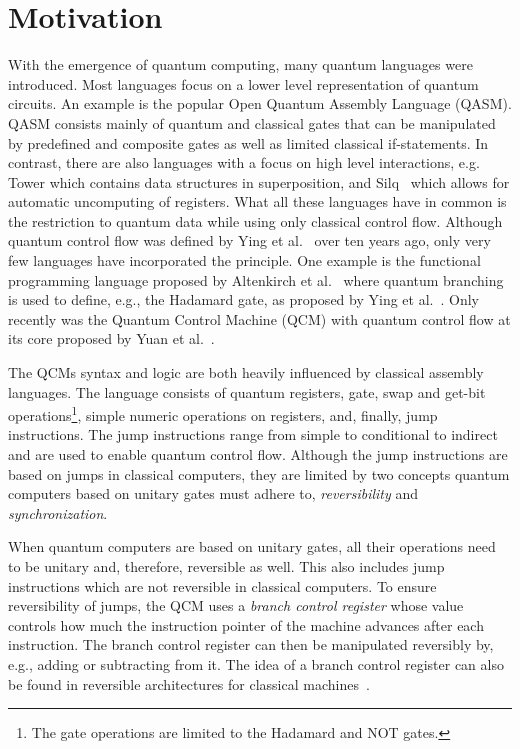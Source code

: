 \chapter{Motivation}
With the emergence of quantum computing, many quantum languages were introduced. Most languages focus on a lower level representation of quantum circuits. An example is the popular Open Quantum Assembly Language (QASM)\cite{CBSG17}. QASM consists mainly of quantum and classical gates that can be manipulated by predefined and composite gates as well as limited classical if-statements. In contrast, there are also languages with a focus on high level interactions, e.g. Tower\cite{ChMi22} which contains data structures in superposition, and Silq~\cite{BBGV20} which allows for automatic uncomputing of registers. What all these languages have in common is the restriction to quantum data while using only classical control flow. Although quantum control flow was defined by Ying et al.~\cite{YYF12} over ten years ago, only very few languages have incorporated the principle. One example is the functional programming language proposed by Altenkirch et al.~\cite{AlGr05} where quantum branching is used to define, e.g., the Hadamard gate, as proposed by Ying et al.~\cite{YYF12}. Only recently was the Quantum Control Machine (QCM) with quantum control flow at its core proposed by Yuan et al.~\cite{YVC24}. 

The QCMs syntax and logic are both heavily influenced by classical assembly languages. The language consists of quantum registers, gate, swap and get-bit operations\footnote{The gate operations are limited to the Hadamard and NOT gates.}, simple numeric operations on registers, and, finally, jump instructions. The jump instructions range from simple to conditional to indirect and are used to enable quantum control flow. Although the jump instructions are based on jumps in classical computers, they are limited by two concepts quantum computers based on unitary gates must adhere to, \emph{reversibility} and \emph{synchronization}.~\cite{YVC24}

When quantum computers are based on unitary gates, all their operations need to be unitary and, therefore, reversible as well. This also includes jump instructions which are not reversible in classical computers. To ensure reversibility of jumps, the QCM uses a \emph{branch control register} whose value controls how much the instruction pointer of the machine advances after each instruction. The branch control register can then be manipulated reversibly by, e.g., adding or subtracting from it. The idea of a branch control register can also be found in reversible architectures for classical machines~\cite{AGY07, TAG12}.

